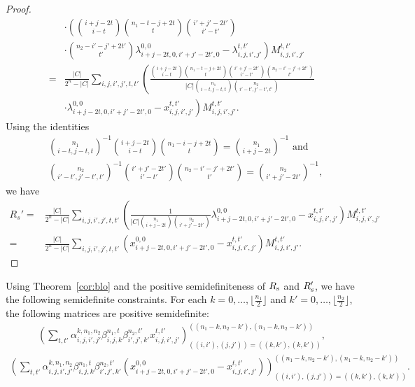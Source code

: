 \documentclass[final,onecolumn]{IEEEtran}
\theoremstyle{definition}
\begin{document}
\begin{proof}
\begin{equation*}
\begin{aligned}
			& \cdot \left( \binom{i+j-2t}{i-t}\binom{n_{1}-t-j+2t}{t} \right. \binom{i'+j'-2t'}{i'-t'}\\
			& \cdot \binom{n_{2}-i'-j'+2t'}{t'} \left. \lambda_{i+j-2t, 0, i'+j'-2t', 0}^{0, 0} - \lambda_{i, j, i', j'}^{t, t'} \right) M_{i, j, i', j'}^{t, t'}\\
			=& \frac{\lvert C \rvert}{2^{n}-\lvert C\rvert} \sum_{i, j, i', j', t, t'} \left( \frac{\binom{i+j-2t}{i-t}\binom{n_{1}-t-j+2t}{t} \binom{i'+j'-2t'}{i'-t'}\binom{n_{2}-i'-j'+2t'}{t'}}{\lvert C \rvert \binom{n_{1}}{i-t, j-t, t}\binom{n_{2}}{i'-t', j'-t', t'}} \right. \\
			&\cdot \lambda_{i+j-2t, 0, i'+j'-2t', 0}^{0, 0}  - \left. x_{i, j, i', j'}^{t, t'} \right) M_{i,j, i', j'}^{t, t'}.
		\end{aligned}
	\end{equation*}
	Using the identities
	\begin{align*}
		&\binom{n_{1}}{i-t, j-t, t}^{-1} \binom{i+j-2t}{i-t}\binom{n_{1}-i-j+2t}{t} = \binom{n_{1}}{i+j-2t}^{-1} \text{ and }\\
		&\binom{n_{2}}{i'-t', j'-t', t'}^{-1} \binom{i'+j'-2t'}{i'-t'}\binom{n_{2}-i'-j'+2t'}{t'} = \binom{n_{2}}{i'+j'-2t'}^{-1},
	\end{align*}
	we have
	\begin{equation*}
		\begin{aligned}
			R_{s}' =& \frac{\lvert C\rvert}{2^{n}-\lvert C\rvert} \sum_{i, j, i', j', t, t'} \left(\frac{1}{\lvert C\rvert \binom{n_{1}}{i+j-2t}\binom{n_{2}}{i'+j'-2t'}} \right. \left.\lambda_{i+j-2t, 0, i'+j'-2t', 0}^{0, 0} - x_{i, j, i', j'}^{t, t'} \right) M_{i, j, i', j'}^{t, t'}\\
			=& \frac{\lvert C \rvert}{2^{n}-\lvert C\rvert} \sum_{i, j, i', j', t, t'} \left( x_{i+j-2t, 0, i'+j'-2t', 0}^{0, 0}-x_{i, j, i', j'}^{t, t'}\right) M_{i, j, i', j'}^{t, t'}.
		\end{aligned}
	\end{equation*}
\end{proof}
	
	
Using Theorem~\ref{cor:blo} and the positive semidefiniteness of $R_{\rm s}$ and $R_{\rm s}'$, we have the following semidefinite constraints. 
For each $k = 0, \dots, \lfloor \frac{n_{1}}{2} \rfloor$ and $k' = 0, \dots, \lfloor \frac{n_{2}}{2} \rfloor$, the following matrices are positive semidefinite: 
\begin{align}
	\left( \sum_{t, t'} \alpha_{i, j, i', j'}^{k, n_{1}, n_{2}} \beta_{i, j, k}^{n_{1}, t} \beta_{i', j', k'}^{n_{2}, t'} x_{i, j, i', j'}^{t, t'}  \right)_{((i, i'), (j, j')) = ((k, k'), (k, k'))}^{((n_{1}-k, n_{2}-k'), (n_{1}-k, n_{2}-k'))}, \label{sem1}
\end{align} 
\begin{align}
	\left( \sum_{t, t'} \alpha_{i, j, i', j'}^{k, n_{1}, n_{2}}  \beta_{i, j, k}^{n_{1}, t} \beta_{i', j', k'}^{n_{2}, t'} (x_{i+j-2t, 0, i'+j'-2t', 0}^{0, 0} -x_{i, j, i', j'}^{t, t'}) \right)_{((i, i'), (j, j')) = ((k, k'), (k, k'))}^{((n_{1}-k, n_{2}-k'), (n_{1}-k, n_{2}-k'))}. \label{sem2}
\end{align} 
	
\end{document}
